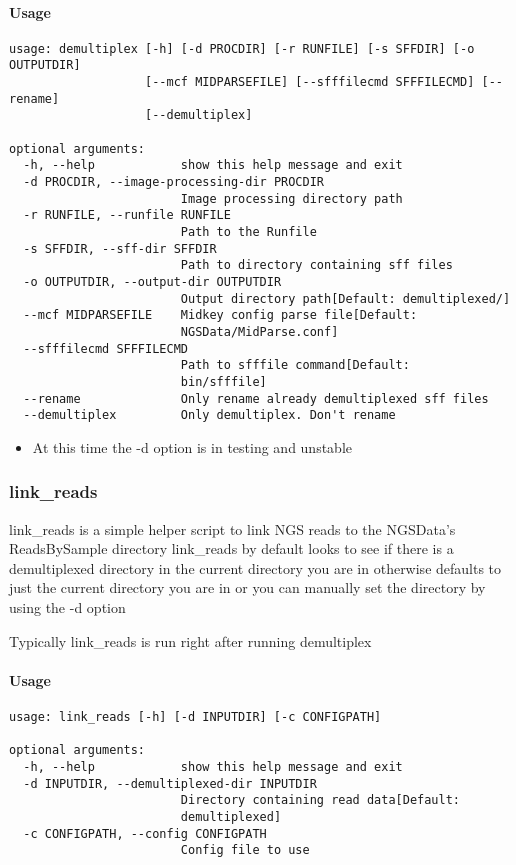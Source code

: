 \documentclass{article}
\begin{document}
\paragraph{Usage}

\begin{lstlisting}
usage: demultiplex [-h] [-d PROCDIR] [-r RUNFILE] [-s SFFDIR] [-o OUTPUTDIR]
                   [--mcf MIDPARSEFILE] [--sfffilecmd SFFFILECMD] [--rename]
                   [--demultiplex]

optional arguments:
  -h, --help            show this help message and exit
  -d PROCDIR, --image-processing-dir PROCDIR
                        Image processing directory path
  -r RUNFILE, --runfile RUNFILE
                        Path to the Runfile
  -s SFFDIR, --sff-dir SFFDIR
                        Path to directory containing sff files
  -o OUTPUTDIR, --output-dir OUTPUTDIR
                        Output directory path[Default: demultiplexed/]
  --mcf MIDPARSEFILE    Midkey config parse file[Default:
                        NGSData/MidParse.conf]
  --sfffilecmd SFFFILECMD
                        Path to sfffile command[Default:
                        bin/sfffile]
  --rename              Only rename already demultiplexed sff files
  --demultiplex         Only demultiplex. Don't rename
\end{lstlisting}
\begin{itemize}
 \item At this time the -d option is in testing and unstable
\end{itemize}

\subsubsection{link\_reads}
link\_reads is a simple helper script to link NGS reads to the NGSData's ReadsBySample directory
link\_reads by default looks to see if there is a demultiplexed directory in the current directory you are in otherwise defaults to just
the current directory you are in or you can manually set the directory by using the -d option

Typically link\_reads is run right after running demultiplex

\paragraph{Usage}

\begin{lstlisting}
usage: link_reads [-h] [-d INPUTDIR] [-c CONFIGPATH]

optional arguments:
  -h, --help            show this help message and exit
  -d INPUTDIR, --demultiplexed-dir INPUTDIR
                        Directory containing read data[Default:
                        demultiplexed]
  -c CONFIGPATH, --config CONFIGPATH
                        Config file to use
\end{lstlisting}
\end{document}
